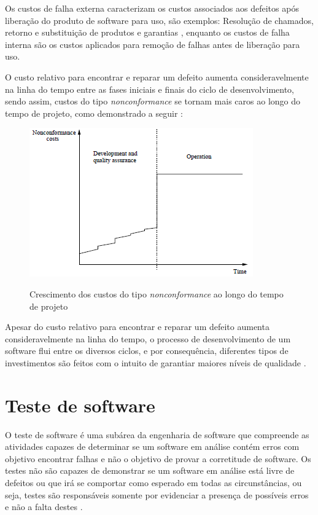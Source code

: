 \documentclass[
	12pt,				%
	oneside,			%
	a4paper,			%
	english,			%
	brazil				%
	]{abntex2ppgsi}
\begin{document}
Os custos de falha externa caracterizam os custos associados aos defeitos após liberação do produto de software para uso, são exemplos: Resolução de chamados, retorno e substituição de produtos e garantias \cite{pressman2009engenharia}, enquanto os custos de falha interna são os custos aplicados para remoção de falhas antes de liberação para uso.

 O custo relativo para encontrar e reparar um defeito aumenta consideravelmente na linha do tempo entre as fases iniciais e finais do ciclo de desenvolvimento, sendo assim, custos do tipo \textit{nonconformance} se tornam mais caros ao longo do tempo de projeto, como demonstrado a seguir \cite{wagner2005}:

\begin{figure}[H]%
	\centering
 	  \caption{Crescimento dos custos do tipo \textit{nonconformance} ao longo do tempo de projeto}
		\includegraphics{nonconformance-costs-timeline.png}
	\label{fig:framework-teste}
\end{figure}

Apesar do custo relativo para encontrar e reparar um defeito aumenta consideravelmente na linha do tempo, o processo de desenvolvimento de um software flui entre os diversos ciclos, e por consequência, diferentes tipos de investimentos são feitos com o intuito de garantiar maiores níveis de qualidade \cite{pressman2009engenharia}. 

\section{Teste de software}
O teste de software é uma subárea da engenharia de software que compreende as atividades capazes de determinar se um software em análise contém erros \cite{gerhart1975} com objetivo encontrar falhas e não o objetivo de provar a corretitude de software. Os testes não são capazes de demonstrar se um software em análise está livre de defeitos ou que irá se comportar como esperado em todas as circunstâncias, ou seja, testes são responsáveis somente por evidenciar a presença de possíveis erros e não a falta destes \cite{pfleeger2010}. 
\end{document}
